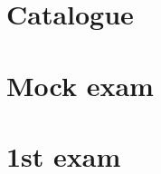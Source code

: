 \documentclass{article}
\author{Leopold Lemmermann}
\begin{document}
\createtitle

\section{Catalogue}




\section[2024]{Mock exam}




\section[2020]{1st exam}
\end{document}
